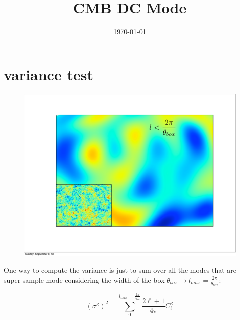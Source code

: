 \documentclass[prd,onecolumn,amsmath,amssymb,floatfix,superscriptaddress,notitlepage]{revtex4-1}
\def\be{\begin{equation}}
\def\ee{\end{equation}}
\begin{document}
\title{CMB DC Mode}
\author{}
\date{\today}

\maketitle


\section{variance test}



\begin{figure}[htbp]
\begin{center}		
\includegraphics[scale=0.3]{./images/box.pdf}
\end{center}
\end{figure}


One way to compute the variance is just to sum over all the modes that are super-sample mode considering the width of the box $\theta_{box}\rightarrow l_{max}=\frac{2\pi}{\theta_{box}}$:

\be \label{eqn:lmax}
(\sigma^{\kappa})^{2}=\sum_{0}^{l_{max}=\frac{2\pi}{\theta_{box}}}\frac{2\ell+1}{4\pi}C_{\ell}^{\kappa}
\ee
\end{document}
